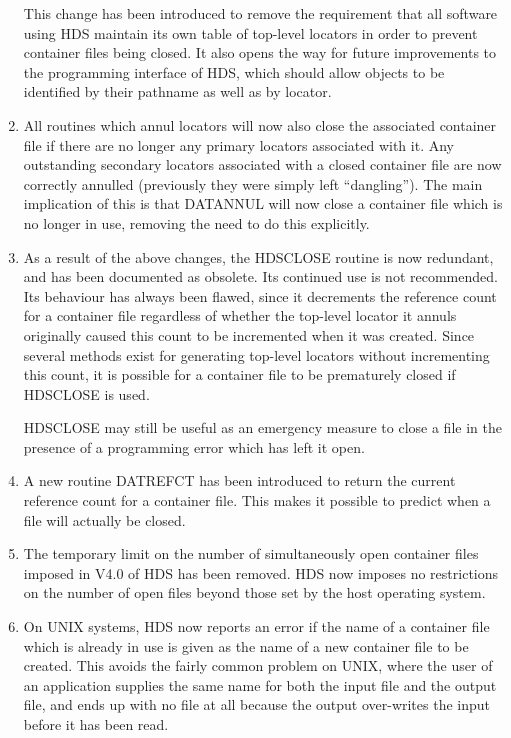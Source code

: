 \documentclass[twoside,11pt]{article}
\newcommand{\htmlref}[2]{#1}
\renewcommand{\_}{\texttt{\symbol{95}}}
\newcommand{\qt}[1]{``#1''}
\newcommand{\qt}[1]{{\tt{"}}#1{\tt{"}}}
\begin{document}
\begin{enumerate}
This change has been introduced to remove the requirement that all
software using HDS maintain its own table of top-level locators in
order to prevent container files being closed. It also opens the way
for future improvements to the programming interface of HDS, which
should allow objects to be identified by their pathname as well as by
locator.

\item
All routines which \htmlref{annul}{sect:annul}
\htmlref{locators}{sect:locators} will now also close the associated
container file if there are no longer any
\htmlref{primary}{sect:primary} locators associated with it. Any
outstanding secondary locators associated with a closed container file
are now correctly annulled (previously they were simply left
\qt{dangling}). The main implication of this is that
\htmlref{DAT\_ANNUL}{DAT_ANNUL} will now close a container file which
is no longer in use, removing the need to do this explicitly.

\item
As a result of the above changes, the \htmlref{HDS\_CLOSE}{HDS_CLOSE}
routine is now redundant, and has been documented as obsolete. Its
continued use is not recommended. Its behaviour has always been
flawed, since it decrements the reference count for a container file
regardless of whether the top-level \htmlref{locator}{sect:locators} it annuls originally
caused this count to be incremented when it was created. Since several
methods exist for generating top-level locators without incrementing
this count, it is possible for a container file to be prematurely
closed if HDS\_CLOSE is used.

HDS\_CLOSE may still be useful as an emergency measure to close a file
in the presence of a programming error which has left it open.

\item
A new routine \htmlref{DAT\_REFCT}{DAT_REFCT} has been introduced to
return the current reference count for a container file. This makes it
possible to predict when a file will actually be closed.

\item
The temporary limit on the number of simultaneously open container
files imposed in V4.0 of HDS has been removed. HDS now imposes no
restrictions on the number of open files beyond those set by the host
operating system.

\item
On UNIX systems, HDS now reports an error if the name of a container
file which is already in use is given as the name of a new container
file to be created.  This avoids the fairly common problem on UNIX,
where the user of an application supplies the same name for both the
input file and the output file, and ends up with no file at all
because the output over-writes the input before it has been read.


\end{enumerate}
\end{document}
